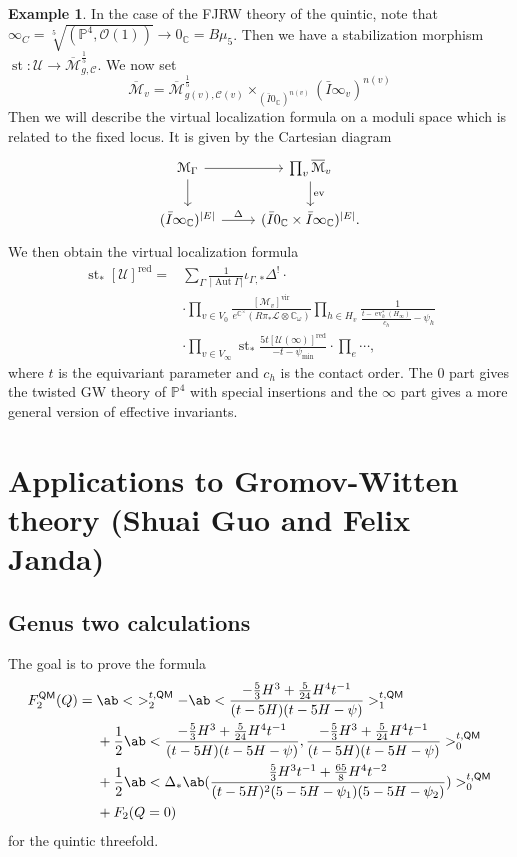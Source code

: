 \documentclass[10pt]{amsart}
\theoremstyle{definition}
\newtheorem{exm}[thm]{Example}
\theoremstyle{remark}
\theoremstyle{plain}
\theoremstyle{definition}
\theoremstyle{remark}
\newcommand{\C}{\mathbb{C}}
\renewcommand{\P}{\mathbb{P}}
\newcommand{\Mbar}{\overline{\mathcal{M}}}
\newcommand{\mc}[1]{\mathcal{#1}}
\newcommand{\mr}[1]{\mathrm{#1}}
\newcommand{\on}[1]{\operatorname{#1}}
\newcommand{\ms}[1]{\mathsf{#1}}
\newcommand{\1}{\mathbf{1}}
\newcommand{\2}{\mathbf{2}}
\newcommand{\3}{\mathbf{3}}
\newcommand{\vir}{\mr{vir}}
\newcommand{\red}{\mr{red}}
\newcommand{\QM}{\ms{QM}}
\DeclareMathOperator{\Aut}{Aut}
\DeclareMathOperator{\ev}{ev}
\begin{document}
\begin{exm}
    In the case of the FJRW theory of the quintic, note that $\infty_C = \sqrt[5]{(\P^4, \mc{O}(1))} \to 0_{\C} = B\mu_5$. Then we have a stabilization morphism $\on{st} \colon\mc{U} \to \Mbar^{\frac{1}{5}}_{g,\mc{C}}$. We now set
    \[ \Mbar_v = \Mbar^{\frac{1}{5}}_{g(v), \mc{C}(v)} \times_{( \bar{I}0_{\C} )^{n(v)}} (\bar{I}\infty_{v})^{n(v)} \]
    Then we will describe the virtual localization formula on a moduli space which is related to the fixed locus. It is given by the Cartesian diagram
    \begin{equation*}
    \begin{tikzcd}
        \mc{M}_{\Gamma} \ar{r} \ar{d} & \prod_v \Mbar_v \ar{d}{\ev} \\
        (\bar{I}\infty_{\C})^{|E|} \ar{r}{\Delta} & (\bar{I}0_{\C} \times \bar{I}\infty_{\C})^{|E|}.
    \end{tikzcd}
    \end{equation*}
    We then obtain the virtual localization formula
    \begin{align*}
        \on{st}_* [\mc{U}]^{\red} ={}& \sum_{\Gamma} \frac{1}{|\Aut \Gamma|} \iota_{\Gamma,*} \Delta^! \cdot \\
        &\cdot \prod_{v \in V_0} \frac{[\mc{M}_v]^{\vir}}{e^{\C^{\times}}(R\pi_* \mc{L} \otimes \C_{\omega})} \prod_{h \in H_v} \frac{1}{\frac{ t-\ev_h^*(H_{\infty}) }{c_h} - \psi_h} \\
        &\cdot \prod_{v \in V_{\infty}} \on{st}_* \frac{5t [\mc{U}(\infty)]^{\red}}{-t-\psi_{\min}} 
        \cdot \prod_{e} \cdots,
    \end{align*}
    where $t$ is the equivariant parameter and $c_h$ is the contact order. The $0$ part gives the twisted GW theory of $\P^4$ with special insertions and the $\infty$ part gives a more general version of effective invariants.
\end{exm}


\section{Applications to Gromov-Witten theory (Shuai Guo and Felix Janda)}%
\label{sec:Calculationslogglsm}

\subsection{Genus two calculations}%
\label{sub:Genus two calculations}

The goal is to prove the formula
\begin{align}
    F_2^{\QM}(Q) ={}& \ab<\ >_2^{t,\QM} - \ab< \frac{-\frac{5}{3}H^3 + \frac{5}{24}H^4t^{-1}}{(t-5H)(t-5H-\psi)}>_1^{t,\QM} \\
    &+ \frac{1}{2} \ab<\frac{-\frac{5}{3}H^3 + \frac{5}{24}H^4 t^{-1}}{(t-5H)(t-5H-\psi)}, \frac{-\frac{5}{3}H^3 + \frac{5}{24}H^4 t^{-1}}{(t-5H)(t-5H-\psi)}>_0^{t,\QM} \label{eqn:c} \\
    &+ \frac{1}{2} \ab<\Delta_* \ab(\frac{\frac{5}{3} H^3 t^{-1}+ \frac{65}{8}H^4 t^{-2}}{(t-5H)^2(5-5H-\psi_1)(5-5H-\psi_2)})>_0^{t,\QM} \label{eqn:d} \\
    &+ F_2(Q=0)
\end{align}
for the quintic threefold.
\end{document}
